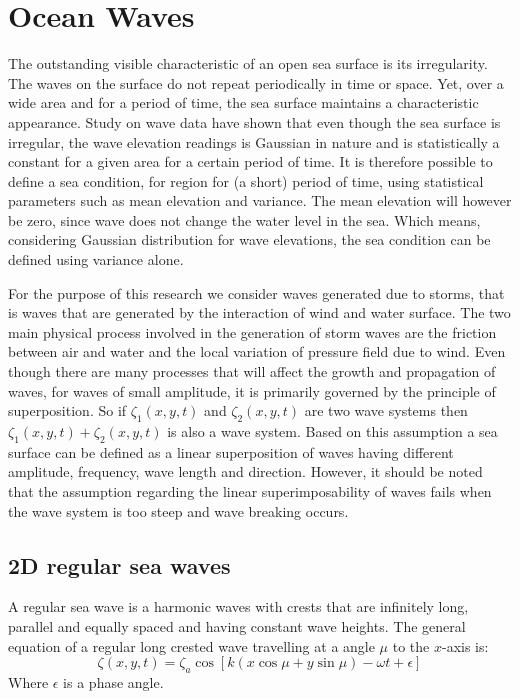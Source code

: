 \section{Ocean Waves} 

The outstanding visible characteristic of an open sea surface is its 
irregularity. The waves on the surface do not repeat periodically in time or 
space. Yet, over a wide area and for a period of time, the sea surface maintains
a characteristic appearance. Study on wave data have shown that even though the
sea surface is irregular, the wave elevation readings is Gaussian in nature and 
is statistically a constant for a given area for a certain period of time. It is
therefore possible to define a sea condition, for region for (a short) period of 
time, using statistical parameters such as mean elevation and variance. The mean
elevation will however be zero, since wave does not change the water level in
the sea. Which means, considering Gaussian distribution for wave elevations, the
sea condition can be defined using variance alone.

For the purpose of this research we consider waves generated due to storms, that
is waves that are generated by the interaction of wind and water surface. The
two main physical process involved in the generation of storm waves are the
friction between air and water and the local variation of pressure field due to
wind. Even though there are many processes that will affect the growth and
propagation of waves, for waves of small amplitude, it is primarily governed by
the principle of superposition. So if $\zeta_1(x,y,t)$ and $\zeta_2(x,y,t)$ are
two wave systems then $\zeta_1(x,y,t) + \zeta_2(x,y,t)$ is also a wave system.
Based on this assumption a sea surface can be defined as a linear superposition
of waves having different amplitude, frequency, wave length and direction. 
However, it should be noted that the assumption regarding the linear 
superimposability of waves fails when the wave system is too steep and wave 
breaking occurs.

\subsection{2D regular sea waves}

A regular sea wave is a harmonic waves with crests that are infinitely long,
parallel and equally spaced and having constant wave heights. The general 
equation of a regular long crested wave travelling at a angle $\mu$ to the 
$x$-axis is:
\begin{equation}
  \zeta (x,y,t) = \zeta_a \cos[k(x \cos \mu + y \sin \mu) - \omega t + \epsilon]
  \label {eq: 2D wave equation}
\end{equation}
Where $\epsilon$ is a phase angle. 

